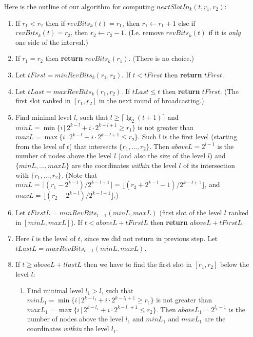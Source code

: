 \documentclass{llncs}
\begin{document}
Here is the outline of our algorithm for computing $nextSlotIn_k(t, r_1,r_2)$:
\begin{enumerate}
\item
If $r_1<r_2$ then 
if $revBits_k(t)=r_1$, then $r_1\gets r_1+1$
else
if $revBits_k(t)=r_2$, then $r_2\gets r_2-1$.
(I.e. remove $revBits_k(t)$ if it is {\em only} one side of the interval.)


\item
If $r_1=r_2$ then {\bf return} $revBits_k(r_1)$. (There is no choice.)


\item 
Let $tFirst=minRevBits_k(r_1, r_2)$.
If $t<tFirst$ then {\bf return} $tFirst$.

\item 
Let $tLast=maxRevBits_k(r_1, r_2)$.
If $tLast\le t$ then {\bf return} $tFirst$. 
(The first slot ranked in $[r_1,r_2]$ in the next round of broadcasting.)

\item\label{find-level-step}
Find minimal level $l$, such that $l\ge \lceil\lg_2 (t+1)\rceil$ and
$minL=\min \{i\,|\, 2^{k-l}+i\cdot 2^{k-l+1}\ge r_1 \}$
is not greater than
$maxL=\max \{i \,|\,   2^{k-l}+i\cdot 2^{k-l+1}\le r_2 \}$.
Such $l$ is the first level (starting from the level of $t$) that
intersects  $\{r_1,\ldots,r_2\}$.
Then
$aboveL=2^{l-1}$ is the number of nodes above the level $l$
(and also the size of the level $l$) and
 $\{minL,\ldots,maxL\}$ 
are the coordinates  {\em within} the level $l$ of its intersection with $\{r_1,\ldots,r_2\}$. 
(Note that
$minL=\lceil (r_1-2^{k-l})/2^{k-l+1}\rceil = \lfloor (r_2+2^{k-l}-1)/2^{k-l+1}\rfloor$,
and $maxL= \lfloor (r_2-2^{k-l})/2^{k-l+1}\rfloor$.)

\item 
Let $tFirstL= minRevBits_{l-1}(minL, maxL)$
(first slot of the level $l$ ranked in $[minL, maxL]$).
If $t< aboveL+tFirstL$ then {\bf return} $aboveL+tFirstL$.

\item
Here $l$ is the level of $t$, since we did not return in previous step.
Let $tLastL= maxRevBits_{l-1}(minL, maxL)$.

\item\label{find-level-step1}
If $t\ge aboveL+tlastL$ then %
we have to find the first slot in $[r_1,r_2]$ below the level $l$: 
  \begin{enumerate}
  \item\label{find-level-step1-substep}
  Find minimal level $l_1>l$, such that 
  $minL_1=\min \{i \,|\, 2^{k-l_1}+i\cdot 2^{k-l_1+1}\ge r_1 \}$
  is not greater than
  $maxL_1=\max \{i \,|\, 2^{k-l_1}+i\cdot 2^{k-l_1+1}\le r_2 \}$.
  Then
  $aboveL_1=2^{l_1-1}$ is the number of nodes above the level $l_1$
  and
  $minL_1$ and $maxL_1$ 
  are the coordinates {\em within} the level $l_1$. 


\end{enumerate}
\end{enumerate}
\end{document}
